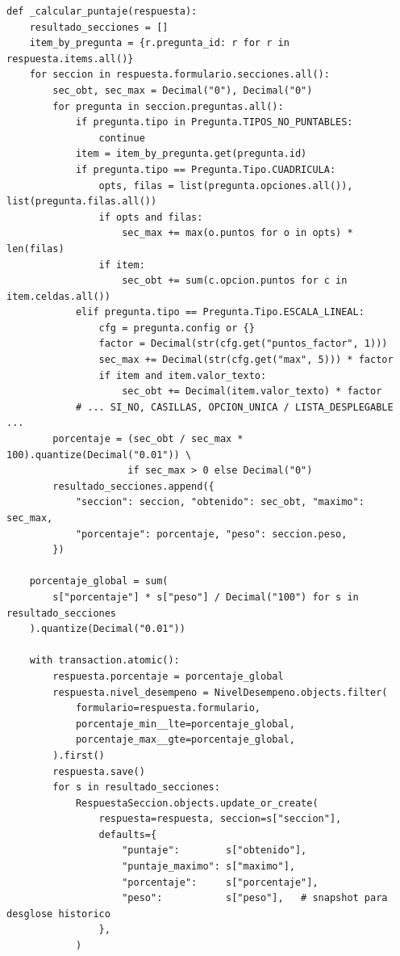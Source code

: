 \begin{Verbatim}[fontsize=\small, frame=single]
def _calcular_puntaje(respuesta):
    resultado_secciones = []
    item_by_pregunta = {r.pregunta_id: r for r in respuesta.items.all()}
    for seccion in respuesta.formulario.secciones.all():
        sec_obt, sec_max = Decimal("0"), Decimal("0")
        for pregunta in seccion.preguntas.all():
            if pregunta.tipo in Pregunta.TIPOS_NO_PUNTABLES:
                continue
            item = item_by_pregunta.get(pregunta.id)
            if pregunta.tipo == Pregunta.Tipo.CUADRICULA:
                opts, filas = list(pregunta.opciones.all()), list(pregunta.filas.all())
                if opts and filas:
                    sec_max += max(o.puntos for o in opts) * len(filas)
                if item:
                    sec_obt += sum(c.opcion.puntos for c in item.celdas.all())
            elif pregunta.tipo == Pregunta.Tipo.ESCALA_LINEAL:
                cfg = pregunta.config or {}
                factor = Decimal(str(cfg.get("puntos_factor", 1)))
                sec_max += Decimal(str(cfg.get("max", 5))) * factor
                if item and item.valor_texto:
                    sec_obt += Decimal(item.valor_texto) * factor
            # ... SI_NO, CASILLAS, OPCION_UNICA / LISTA_DESPLEGABLE ...
        porcentaje = (sec_obt / sec_max * 100).quantize(Decimal("0.01")) \
                     if sec_max > 0 else Decimal("0")
        resultado_secciones.append({
            "seccion": seccion, "obtenido": sec_obt, "maximo": sec_max,
            "porcentaje": porcentaje, "peso": seccion.peso,
        })

    porcentaje_global = sum(
        s["porcentaje"] * s["peso"] / Decimal("100") for s in resultado_secciones
    ).quantize(Decimal("0.01"))

    with transaction.atomic():
        respuesta.porcentaje = porcentaje_global
        respuesta.nivel_desempeno = NivelDesempeno.objects.filter(
            formulario=respuesta.formulario,
            porcentaje_min__lte=porcentaje_global,
            porcentaje_max__gte=porcentaje_global,
        ).first()
        respuesta.save()
        for s in resultado_secciones:
            RespuestaSeccion.objects.update_or_create(
                respuesta=respuesta, seccion=s["seccion"],
                defaults={
                    "puntaje":        s["obtenido"],
                    "puntaje_maximo": s["maximo"],
                    "porcentaje":     s["porcentaje"],
                    "peso":           s["peso"],   # snapshot para desglose historico
                },
            )
\end{Verbatim}


